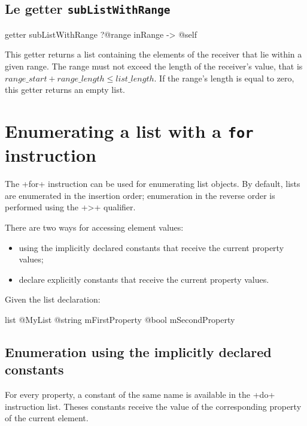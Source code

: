 \subsection{Le getter \texttt{subListWithRange}}

\begin{galgas}
getter subListWithRange
  ?@range inRange
  -> @self
\end{galgas}

This getter returns a list containing the elements of the receiver that lie within a given range. The range must not exceed the length of the receiver's value, that is $range\_start + range\_length \leqslant list\_length$. If the range's length is equal to zero, this getter returns an empty list.















\section{Enumerating a list with a \texttt{for} instruction}

The \ggs+for+ instruction can be used for enumerating list objects. By default, lists are enumerated in the insertion order; enumeration in the reverse order is performed using the \ggs+>+ qualifier.

There are two ways for accessing element values:
\begin{itemize}
\item using the implicitly declared constants that receive the current property values;
\item declare explicitly constants that receive the current property values.
\end{itemize}

Given the list declaration:

\begin{galgas}
list @MyList {
  @string mFirstProperty
  @bool mSecondProperty
}
\end{galgas}

\subsection{Enumeration using the implicitly declared constants}

For every property, a constant of the same name is available in the \ggs+do+ instruction list. Theses constants receive the value of the corresponding property of the current element.

